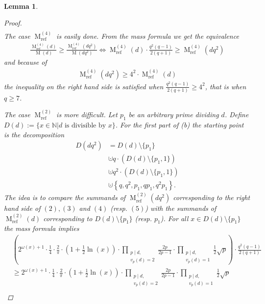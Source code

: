 \documentclass{amsart}
\newtheorem{lem}[thm]{Lemma}
\theoremstyle{definition}
\theoremstyle{remark}
\def\NN{\mathbb{N}}
\def\|{\left | \right.}
\DeclareMathOperator{\M}{M}
\begin{document}
\begin{lem}
\begin{proof}
\begin{align*}
  \end{align*}
  The case $\M^{(4)}_{\mathrm{ref}}$ is easily done. From the mass formula we get the equivalence
  \begin{align*}
     \frac{\M^{(4)}_{\mathrm{ref}}(d)}{\M(d)} \geq \frac{\M^{(4)}_{\mathrm{ref}}(dq^2)}{\M(dq^2)} 
     \Longleftrightarrow \M^{(4)}_{\mathrm{ref}}(d) \cdot \frac{q^2(q-1)}{2 (q+1)} \geq \M^{(4)}_{\mathrm{ref}}(dq^2)
  \end{align*}
 and because of 
 \begin{align*}
  \M^{(4)}_{\mathrm{ref}}(dq^2) \geq 4^2 \cdot \M^{(4)}_{\mathrm{ref}}(d)
 \end{align*}
 the inequality on the right hand side is satisfied when $\tfrac{q^2(q-1)}{2 (q+1)} \geq 4^2$,
 that is when $q \geq 7$.
 
 The case $\M^{(2)}_{\mathrm{ref}}$ is more difficult. Let $p_1$ be an arbitrary prime dividing $d$. 
 Define $D(d):=\{ x \in \NN \| \text{$d$ is divisible by $x$}\}$.
 For the first part of (b) the starting point is the decomposition
 \begin{align}
  D(dq^2) & =  D(d)\setminus \{p_1\} \\
                & \cupdot  q \cdot \left(D(d)\setminus \{p_1,1\} \right) \\
                & \cupdot q^2 \cdot \left(D(d)\setminus \{p_1,1\} \right) \\
                & \cupdot \left\{q, q^2, p_1, q p_1, q^2  p_1 \right\}.
 \end{align}
 The idea is to compare the summands of $\M^{(2)}_{\mathrm{ref}}(dq^2)$ corresponding to the right hand side of $(2), (3)$ and $(4)$ (resp.
 $(5)$) with the summands of $\M^{(2)}_{\mathrm{ref}}(d)$ corresponding to $D(d)\setminus \{p_1\}$ (resp. $p_1$).
 For all $x \in D(d) \setminus \{p_1\}$ the mass formula implies
 \begin{align*}
  & \left( 2^{\omega(x)+1} \cdot \frac{1}{4} \cdot \frac{2}{\pi} 
    \cdot  \left(1+\frac{1}{2}\ln(x)\right)
    \cdot \prod_{\substack{p \mid d,\\v_p(d)=2}}\frac{2p}{2p-1} \cdot \prod_{\substack{p \mid d,\\v_p(d)=1}}\frac{1}{2}\sqrt{p}\right)
    \cdot \frac{q^2(q-1)}{2 (q+1)} \\
  & \geq  2^{\omega(x)+1} \cdot \frac{1}{4} \cdot \frac{2}{\pi} 
           \cdot  \left(1+\frac{1}{2}\ln(x)\right)
           \cdot \prod_{\substack{p \mid d,\\v_p(d)=2}}\frac{2p}{2p-1} \cdot \prod_{\substack{p \mid d,\\v_p(d)=1}}\frac{1}{2}\sqrt{p} \\          

\end{align*}
\end{proof}
\end{lem}
\end{document}
